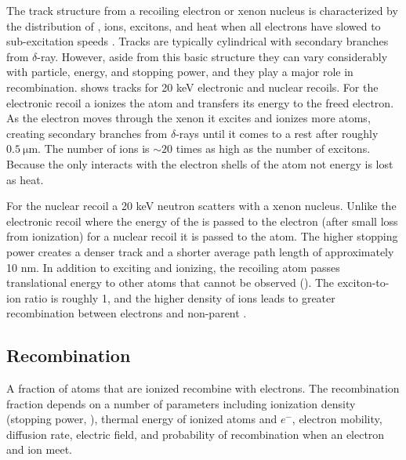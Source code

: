 The track structure from a recoiling electron or xenon nucleus is characterized by the distribution of \electron, ions, excitons, and heat
when all electrons have slowed to sub-excitation speeds .  Tracks are typically cylindrical with secondary branches
from $\delta$-ray.  However, aside from this basic structure they can vary considerably with particle, energy, and
stopping power, and they play a major role in recombination.   shows tracks for 20 keV electronic and
nuclear
recoils.  For the electronic recoil a \gammaray ionizes the atom and transfers its energy to the freed electron.  As the electron moves
through the xenon it excites and ionizes more atoms, creating secondary branches from $\delta$-rays until it comes to a rest after
roughly $0.5\ \mathrm{\mu m}$.  The number of ions is ${\sim}20$ times as high as the number of excitons.  Because the \electron only
interacts with the electron shells of the atom not energy is lost as heat.

For the nuclear recoil a 20 keV neutron scatters with a xenon nucleus.  Unlike the electronic recoil where the energy of the \gammaray is
passed to the electron (after small loss from ionization) for a nuclear recoil it is passed to the atom.  The higher stopping power
creates a denser track and a shorter average path length of approximately 10 nm.  In addition to exciting and ionizing, the recoiling atom
passes translational energy to other atoms that cannot be observed ().  The exciton-to-ion ratio is roughly
1, and the higher density of ions leads to greater recombination between electrons and non-parent .


\subsection{Recombination}
\label{subsec:recombination}
A fraction of atoms that are ionized recombine with electrons.  The recombination fraction depends on a number of parameters
including ionization density
(stopping power, ), thermal energy of ionized atoms and $e^{-}$, electron mobility, diffusion rate, electric
field, and probability of recombination when an electron and ion meet.

